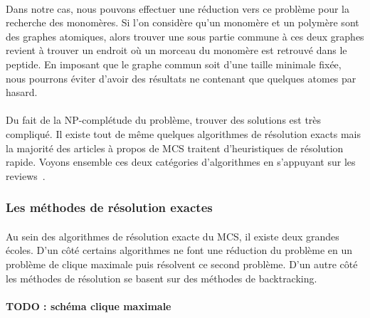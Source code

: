 \documentclass[12pt,french,twoside]{report}
\begin{document}
\paragraph{}Dans notre cas, nous pouvons effectuer une réduction vers ce problème pour la recherche des monomères.
Si l'on considère qu'un monomère et un polymère sont des graphes atomiques, alors trouver une sous partie commune à ces deux graphes revient à trouver un endroit où un morceau du monomère est retrouvé dans le peptide.
En imposant que le graphe commun soit d'une taille minimale fixée, nous pourrons éviter d'avoir des résultats ne contenant que quelques atomes par hasard.

\paragraph{}Du fait de la NP-complétude du problème, trouver des solutions est très compliqué.
Il existe tout de même quelques algorithmes de résolution exacts mais la majorité des articles à propos de MCS traitent d'heuristiques de résolution rapide.
Voyons ensemble ces deux catégories d'algorithmes en s'appuyant sur les reviews~\cite{raymond_maximum_2002, ehrlich_maximum_2011}.


\subsubsection{Les méthodes de résolution exactes}

\paragraph{}Au sein des algorithmes de résolution exacte du MCS, il existe deux grandes écoles.
D'un côté certains algorithmes ne font une réduction du problème en un problème de clique maximale puis résolvent ce second problème.
D'un autre côté les méthodes de résolution se basent sur des méthodes de backtracking.


\paragraph{TODO : schéma clique maximale}
\end{document}
